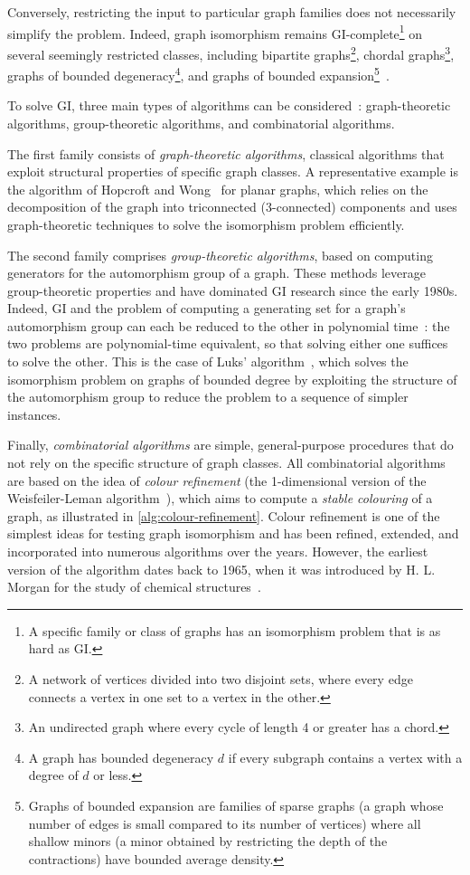 Conversely, restricting the input to particular graph families does not necessarily simplify the problem. Indeed, graph isomorphism remains GI-complete\footnote{A specific family or class of graphs has an isomorphism problem that is as hard as GI.} on several seemingly restricted classes, including bipartite graphs\footnote{A network of vertices divided into two disjoint sets, where every edge connects a vertex in one set to a vertex in the other.}, chordal graphs\footnote{An undirected graph where every cycle of length 4 or greater has a chord.}, graphs of bounded degeneracy\footnote{A graph has bounded degeneracy $d$ if every subgraph contains a vertex with a degree of $d$ or less.}, and graphs of bounded expansion\footnote{Graphs of bounded expansion are families of sparse graphs (a graph whose number of edges is small compared to its number of vertices) where all shallow minors (a minor obtained by restricting the depth of the contractions) have bounded average density.}~\cite{grohe2012structural}.

To solve GI, three main types of algorithms can be considered~\cite{grohe2012structural}: graph-theoretic algorithms, group-theoretic algorithms, and combinatorial algorithms.

The first family consists of \emph{graph-theoretic algorithms}, classical algorithms that exploit structural properties of specific graph classes. A representative example is the algorithm of Hopcroft and Wong~\cite{hopcroft1974linear} for planar graphs, which relies on the decomposition of the graph into triconnected (3-connected) components and uses graph-theoretic techniques to solve the isomorphism problem efficiently.

The second family comprises \emph{group-theoretic algorithms}, based on computing generators for the automorphism group of a graph. These methods leverage group-theoretic properties and have dominated GI research since the early 1980s. Indeed, GI and the problem of computing a generating set for a graph's automorphism group can each be reduced to the other in polynomial time~\cite{mathon1979note}: the two problems are polynomial-time equivalent, so that solving either one suffices to solve the other. This is the case of Luks' algorithm~\cite{luks1982isomorphism}, which solves the isomorphism problem on graphs of bounded degree by exploiting the structure of the automorphism group to reduce the problem to a sequence of simpler instances.


Finally, \emph{combinatorial algorithms} are simple, general-purpose procedures that do not rely on the specific structure of graph classes. All combinatorial algorithms are based on the idea of \emph{colour refinement} (the 1-dimensional version of the Weisfeiler-Leman algorithm~\cite{kiefer2020power}), which aims to compute a \emph{stable colouring} of a graph, as illustrated in \cref{alg:colour-refinement}. Colour refinement is one of the simplest ideas for testing graph isomorphism and has been refined, extended, and incorporated into numerous algorithms over the years. However, the earliest version of the algorithm dates back to 1965, when it was introduced by H. L. Morgan for the study of chemical structures~\cite{morgan1965generation}.

